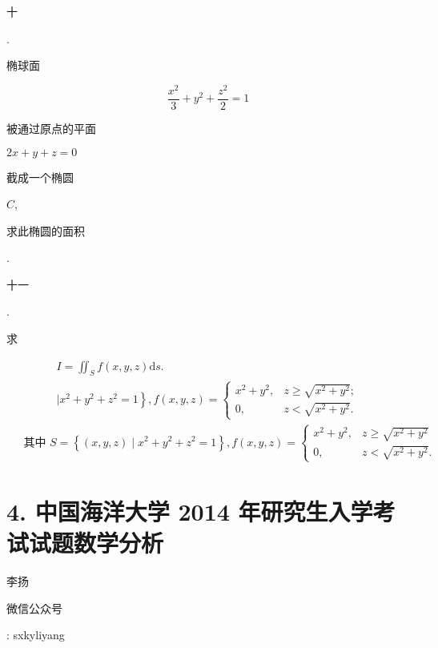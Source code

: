 \documentclass[10pt]{article}
\begin{document}
\begin{CJK}{UTF8}{mj}十\end{CJK}. \begin{CJK}{UTF8}{mj}椭球面\end{CJK}
$$
\frac{x^{2}}{3}+y^{2}+\frac{z^{2}}{2}=1
$$
\begin{CJK}{UTF8}{mj}被通过原点的平面\end{CJK} $2 x+y+z=0$ \begin{CJK}{UTF8}{mj}截成一个椭圆\end{CJK} $C$, \begin{CJK}{UTF8}{mj}求此椭圆的面积\end{CJK}.

\begin{CJK}{UTF8}{mj}十一\end{CJK}. \begin{CJK}{UTF8}{mj}求\end{CJK}
$$
\begin{gathered}
I=\iint_{S} f(x, y, z) \mathrm{d} s . \\
\left.\mid x^{2}+y^{2}+z^{2}=1\right\}, f(x, y, z)= \begin{cases}x^{2}+y^{2}, & z \geqslant \sqrt{x^{2}+y^{2}} ; \\
0, & z<\sqrt{x^{2}+y^{2}} .\end{cases}
\end{gathered}
$$
$$
\begin{aligned}
& \text { 其中 } S=\left\{(x, y, z) \mid x^{2}+y^{2}+z^{2}=1\right\}, f(x, y, z)= \begin{cases}x^{2}+y^{2}, & z \geqslant \sqrt{x^{2}+y^{2}} \\ 0, & z<\sqrt{x^{2}+y^{2}} .\end{cases} 
\end{aligned}
$$

\section{4. 中国海洋大学 2014 年研究生入学考试试题数学分析}
\begin{CJK}{UTF8}{mj}李扬\end{CJK}

\begin{CJK}{UTF8}{mj}微信公众号\end{CJK}: sxkyliyang
\end{document}
